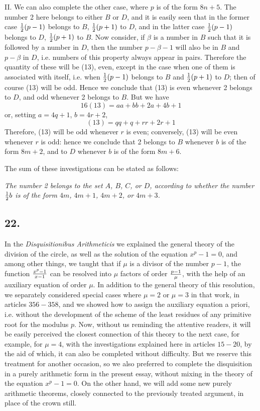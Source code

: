 \documentclass[twoside,12pt, showframe]{memoir}
\let\oldfrac\frac
\def\frac#1#2{\mathchoice{\tfrac{#1}{#2}}{\oldfrac{#1}{#2}}{\genfrac{}{}{}{2}{#1}{#2\mathstrut}}{\genfrac{}{}{}{3}{#1}{#2\mathstrut}}}
\begin{document}
II. We can also complete the other case, where \(p\) is of the form \(8n+5\). The number 2 here belongs to either \(B\) or \(D\), and it is easily seen that in the former case \(\frac{1}{2}(p-1)\) belongs to \(B\), \(\frac{1}{2}(p+1)\) to \(D\), and in the latter case \(\frac{1}{2}(p-1)\) belongs to \(D\), \(\frac{1}{2}(p+1)\) to \(B\). Now consider, if \(\beta\) is a number in \(B\) such that it is followed by a number in \(D\), then the number \(p-\beta-1\) will also be in \(B\) and \(p-\beta\) in \(D\), i.e. numbers of this property always appear in pairs. Therefore the quantity of these will be (13), even, except in the case when one of them is associated with itself, i.e. when \(\frac{1}{2}(p-1)\) belongs to \(B\) and \(\frac{1}{2}(p+1)\) to \(D\); then of course (13) will be odd. Hence we conclude that (13) is even whenever 2 belongs to \(D\), and odd whenever 2 belongs to \(B\). But we have
\[16(13)=a a+b b+2 a+4 b+1\]
or, setting \(a=4q+1\), \(b=4r+2\),
\[(13)=q q+q+r r+2 r+1\]
Therefore, (13) will be odd whenever \(r\) is even; conversely, (13) will be even whenever \(r\) is odd: hence we conclude that 2 belongs to \(B\) whenever \(b\) is of the form \(8m+2\), and to \(D\) whenever \(b\) is of the form \(8m+6\).
%

The sum of these investigations can be stated as follows:

\textit{The number 2 belongs to the set \(A\), \(B\), \(C\), or \(D\), according to whether the number \(\frac{1}{2} b\) is of the form \(4m\), \(4m+1\), \(4m+2\), or \(4m+3\).}
%

\subsection*{22.}

In the \textit{Disquisitionibus Arithmeticis} we explained the general theory of the division of the circle, as well as the solution of the equation \(x^{p}-1=0\), and among other things, we taught that if \(\mu\) is a divisor of the number \(p-1\), the function \(\frac{x^{p}-1}{x-1}\) can be resolved into \(\mu\) factors of order \(\frac{p-1}{\mu}\), with the help of an auxiliary equation of order \(\mu\). In addition to the general theory of this resolution, we separately considered special cases where \(\mu=2\) or \(\mu=3\) in that work, in articles \(356-358\), and we showed how to assign the auxiliary equation a priori, i.e. without the development of the scheme of the least residues of any primitive root for the modulus \(p\). Now, without us reminding the attentive readers, it will be easily perceived the closest connection of this theory to the next case, for example, for \(\mu=4\), with the investigations explained here in articles \(15-20\), by the aid of which, it can also be completed without difficulty. But we reserve this treatment for another occasion, so we also preferred to complete the disquisition in a purely arithmetic form in the present essay, without mixing in the theory of the equation \(x^{p}-1=0\). On the other hand, we will add some new purely arithmetic theorems, closely connected to the previously treated argument, in place of the crown still.
%
\end{document}
